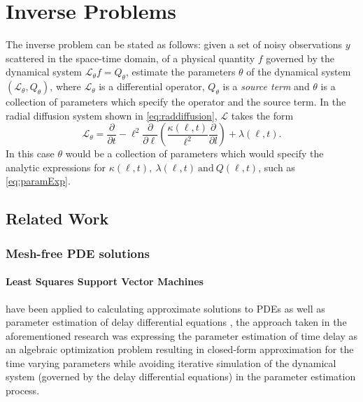 \section{Inverse Problems}\label{sec:inv}

The inverse problem can be stated as follows: given a set of noisy observations $y$ scattered in 
the space-time domain, of a physical quantity $f$ governed by the dynamical system 
$\mathcal{L}_{\theta} f = Q_{\theta}$, estimate the parameters $\theta$ of the dynamical system 
$(\mathcal{L}_{\theta}, Q_{\theta})$, where $\mathcal{L}_{\theta}$ is a differential operator, 
$Q_{\theta}$ is a \emph{source term} and $\theta$ is a collection of parameters which specify the 
operator and the source term. In the radial diffusion system shown in \cref{eq:raddiffusion}, 
$\mathcal{L}$ takes the form  
%
\[
  \mathcal{L}_{\theta} =
    \frac{\partial}{\partial{t}} - 
    \ell^2 \frac{\partial}{\partial{\ell}}\left( 
      \frac{\kappa(\ell, t)}{\ell^{2}} \frac{\partial}{\partial{l}} 
    \right) + 
    \lambda(\ell,t).  
\] 
%
In this case $\theta$ would be a collection of parameters which would specify the analytic 
expressions for $\kappa(\ell, t), \ \lambda(\ell,t) \ \text{and} \ Q(\ell,t)$, such as 
\cref{eq:paramExp}.

\subsection{Related Work}

\subsubsection*{Mesh-free PDE solutions}

\paragraph{Least Squares Support Vector Machines} have been applied to calculating 
approximate solutions to PDEs \citep{MEHRKANOON2015105,MEHRKANOON20122502} as well as parameter 
estimation of delay differential equations \citep{MEHRKANOON2014830}, the approach taken in the 
aforementioned research \citep{MEHRKANOON2014830} was expressing the parameter estimation of time 
delay as an algebraic optimization problem resulting in closed-form approximation for the time 
varying parameters while avoiding iterative simulation of the dynamical system (governed by the 
delay differential equations) in the parameter estimation process.

